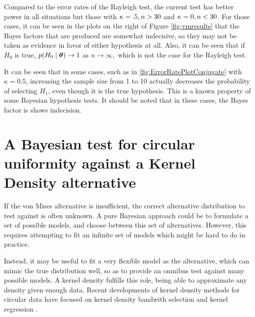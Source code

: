Compared to the error rates of the Rayleigh test, the current test has better power in all situations but those with \( \kappa = .5, n > 30\) and \(\kappa = 0, n < 30\). For those cases, it can be seen in the plots on the right of Figure \ref{fig:vmresults} that the Bayes factors that are produced are somewhat indecisive, so they may not be taken as evidence in favor of either hypothesis at all. Also, it can be seen that if \( H_0 \) is true, \( p(H_0 \mid \boldsymbol{\theta} ) \rightarrow 1 \) as \( n \rightarrow \infty,\) which is not the case for the Rayleigh test.

It can be seen that in some cases, such as in \ref{fig:ErrorRatePlotConjugate} with \(\kappa = 0.5\), increasing the sample size from 1 to 10 actually decreases the probability of selecting \(H_1\), even though it is the true hypothesis. This is a known property of some Bayesian hypothesis tests. It should be noted that in these cases, the Bayes factor is shows indecision. 


\section{A Bayesian test for circular uniformity against a Kernel Density alternative}
\label{sec:KDE}

If the von Mises alternative is insufficient, the correct alternative distribution to test against is often unknown. A pure Bayesian approach could be to formulate a set of possible models, and choose between this set of alternatives. However, this requires attempting to fit an infinite set of models which might be hard to do in practice.

Instead, it may be useful to fit a very flexible model as the alternative, which can mimic the true distribution well, so as to provide an omnibus test against many possible models. A kernel density fulfills this role, being able to approximate any density given enough data. Recent developments of kernel density methods for circular data have focused on kernel density bandwith selection and kernel regression  \citep{di2009local,  oliveira2012plug, di2013non, JSSv061i09}.


